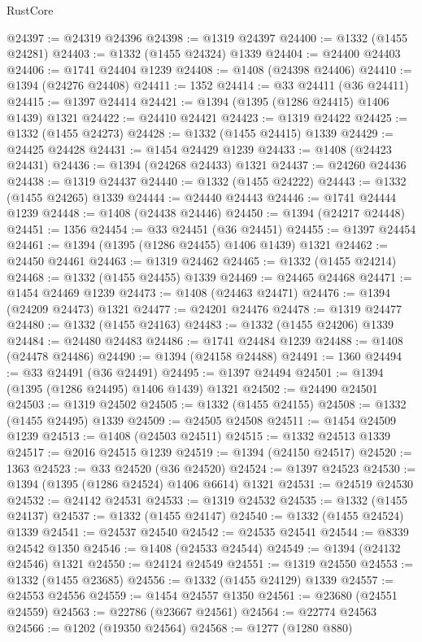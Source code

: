 \begin{lexlean}{RustCore}
\begin{coremodule}
@24397 := @24319 @24396
@24398 := @1319 @24397
@24400 := @1332 (@1455 @24281)
@24403 := @1332 (@1455 @24324) @1339
@24404 := @24400 @24403
@24406 := @1741 @24404 @1239
@24408 := @1408 (@24398 @24406)
@24410 := @1394 (@24276 @24408)
@24411 := 1352
@24414 := @33 @24411 (@36 @24411)
@24415 := @1397 @24414
@24421 := @1394 (@1395 (@1286 @24415) @1406 @1439) @1321
@24422 := @24410 @24421
@24423 := @1319 @24422
@24425 := @1332 (@1455 @24273)
@24428 := @1332 (@1455 @24415) @1339
@24429 := @24425 @24428
@24431 := @1454 @24429 @1239
@24433 := @1408 (@24423 @24431)
@24436 := @1394 (@24268 @24433) @1321
@24437 := @24260 @24436
@24438 := @1319 @24437
@24440 := @1332 (@1455 @24222)
@24443 := @1332 (@1455 @24265) @1339
@24444 := @24440 @24443
@24446 := @1741 @24444 @1239
@24448 := @1408 (@24438 @24446)
@24450 := @1394 (@24217 @24448)
@24451 := 1356
@24454 := @33 @24451 (@36 @24451)
@24455 := @1397 @24454
@24461 := @1394 (@1395 (@1286 @24455) @1406 @1439) @1321
@24462 := @24450 @24461
@24463 := @1319 @24462
@24465 := @1332 (@1455 @24214)
@24468 := @1332 (@1455 @24455) @1339
@24469 := @24465 @24468
@24471 := @1454 @24469 @1239
@24473 := @1408 (@24463 @24471)
@24476 := @1394 (@24209 @24473) @1321
@24477 := @24201 @24476
@24478 := @1319 @24477
@24480 := @1332 (@1455 @24163)
@24483 := @1332 (@1455 @24206) @1339
@24484 := @24480 @24483
@24486 := @1741 @24484 @1239
@24488 := @1408 (@24478 @24486)
@24490 := @1394 (@24158 @24488)
@24491 := 1360
@24494 := @33 @24491 (@36 @24491)
@24495 := @1397 @24494
@24501 := @1394 (@1395 (@1286 @24495) @1406 @1439) @1321
@24502 := @24490 @24501
@24503 := @1319 @24502
@24505 := @1332 (@1455 @24155)
@24508 := @1332 (@1455 @24495) @1339
@24509 := @24505 @24508
@24511 := @1454 @24509 @1239
@24513 := @1408 (@24503 @24511)
@24515 := @1332 @24513 @1339
@24517 := @2016 @24515 @1239
@24519 := @1394 (@24150 @24517)
@24520 := 1363
@24523 := @33 @24520 (@36 @24520)
@24524 := @1397 @24523
@24530 := @1394 (@1395 (@1286 @24524) @1406 @6614) @1321
@24531 := @24519 @24530
@24532 := @24142 @24531
@24533 := @1319 @24532
@24535 := @1332 (@1455 @24137)
@24537 := @1332 (@1455 @24147)
@24540 := @1332 (@1455 @24524) @1339
@24541 := @24537 @24540
@24542 := @24535 @24541
@24544 := @8339 @24542 @1350
@24546 := @1408 (@24533 @24544)
@24549 := @1394 (@24132 @24546) @1321
@24550 := @24124 @24549
@24551 := @1319 @24550
@24553 := @1332 (@1455 @23685)
@24556 := @1332 (@1455 @24129) @1339
@24557 := @24553 @24556
@24559 := @1454 @24557 @1350
@24561 := @23680 (@24551 @24559)
@24563 := @22786 (@23667 @24561)
@24564 := @22774 @24563
@24566 := @1202 (@19350 @24564)
@24568 := @1277 (@1280 @880)

\end{coremodule}
\end{lexlean}
